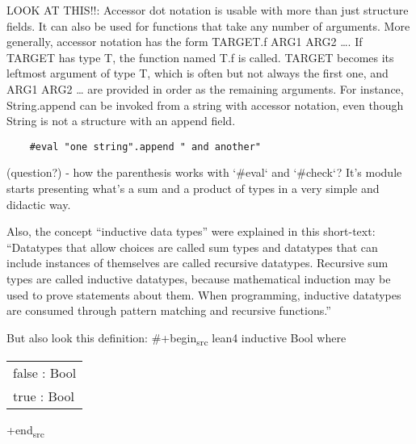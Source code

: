 \documentclass[11pt]{scrlttr2}
\begin{document}
\begin{letter}{%
\mbox{}}
LOOK AT THIS!!:
    Accessor dot notation is usable with more than just structure fields. It can also be used for functions that take any number of arguments. More generally, accessor notation has the form TARGET.f ARG1 ARG2 \ldots{}. If TARGET has type T, the function named T.f is called. TARGET becomes its leftmost argument of type T, which is often but not always the first one, and ARG1 ARG2 \ldots{} are provided in order as the remaining arguments. For instance, String.append can be invoked from a string with accessor notation, even though String is not a structure with an append field.

\begin{verbatim}
    #eval "one string".append " and another"
\end{verbatim}

(question?) - how the parenthesis works with `\#eval` and `\#check`?
It's module starts presenting what's a sum and a product of types in a
very simple and didactic way.

Also, the concept ``inductive data types'' were explained in this short-text:
``Datatypes that allow choices are called sum types and datatypes that can include instances of themselves are called recursive datatypes. Recursive sum types are called inductive datatypes, because mathematical induction may be used to prove statements about them. When programming, inductive datatypes are consumed through pattern matching and recursive functions.''

But also look this definition:
\#+begin\textsubscript{src} lean4
    inductive Bool where
\begin{center}
\begin{tabular}{l}
false : Bool\\
true : Bool\\
\end{tabular}
\end{center}
+end\textsubscript{src}
\closing{}




\end{letter}
\end{document}
